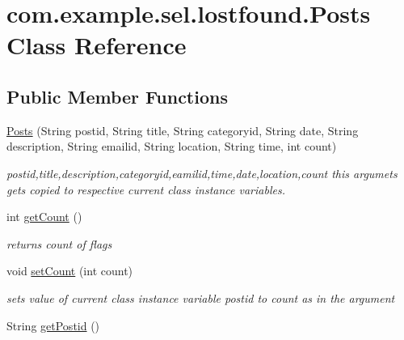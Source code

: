 \hypertarget{classcom_1_1example_1_1sel_1_1lostfound_1_1Posts}{\section{com.\-example.\-sel.\-lostfound.\-Posts \-Class \-Reference}
\label{classcom_1_1example_1_1sel_1_1lostfound_1_1Posts}
}
\subsection*{\-Public \-Member \-Functions}
\begin{DoxyCompactItemize}
\item 
\hyperlink{classcom_1_1example_1_1sel_1_1lostfound_1_1Posts_adc28f0ba0037eb0ce8b0eaa897ebe9ac}{\-Posts} (\-String postid, \-String title, \-String categoryid, \-String date, \-String description, \-String emailid, \-String location, \-String time, int count)
\begin{DoxyCompactList}\small\item\em postid,title,description,categoryid,eamilid,time,date,location,count this argumets gets copied to respective current class instance variables. \end{DoxyCompactList}\item 
\hypertarget{classcom_1_1example_1_1sel_1_1lostfound_1_1Posts_ace0127999b83586aa9c8019f90d0681c}{int \hyperlink{classcom_1_1example_1_1sel_1_1lostfound_1_1Posts_ace0127999b83586aa9c8019f90d0681c}{get\-Count} ()}\label{classcom_1_1example_1_1sel_1_1lostfound_1_1Posts_ace0127999b83586aa9c8019f90d0681c}

\begin{DoxyCompactList}\small\item\em returns count of flags \end{DoxyCompactList}\item 
void \hyperlink{classcom_1_1example_1_1sel_1_1lostfound_1_1Posts_a4f66f3e0397b6633e77dda40e5319acc}{set\-Count} (int count)
\begin{DoxyCompactList}\small\item\em sets value of current class instance variable postid to count as in the argument \end{DoxyCompactList}\item 
\hypertarget{classcom_1_1example_1_1sel_1_1lostfound_1_1Posts_a1943a37420938d7c76fbeccef90c731a}{\-String \hyperlink{classcom_1_1example_1_1sel_1_1lostfound_1_1Posts_a1943a37420938d7c76fbeccef90c731a}{get\-Postid} ()}\label{classcom_1_1example_1_1sel_1_1lostfound_1_1Posts_a1943a37420938d7c76fbeccef90c731a}


\end{DoxyCompactItemize}
